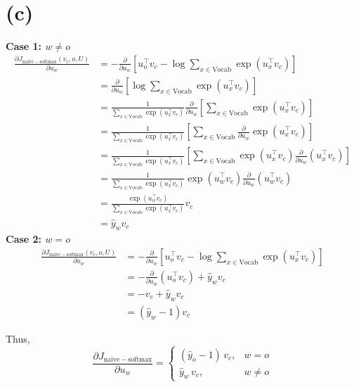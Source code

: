 \documentclass[12pt]{article}
\begin{document}
\section*{(c)}

\textbf{Case 1: $w \neq o$}
\begin{align*}
    \frac{\partial J_{\mathrm{naive-softmax}}(v_c, o, U)}{\partial u_{w}}
    &= - \frac{\partial }{\partial u_{w}} \left[ u_{o}^{\top}v_{c} - \log \sum_{x \in \mathrm{Vocab}} \exp(u_{x}^{\top}v_{c}) \right] \\
    &= \frac{\partial }{ \partial u_{w}} \left[\log \sum_{x \in \mathrm{Vocab}} \exp(u_{x}^{\top} v_{c})\right] \\
    &= \frac{1}{\sum_{x \in \mathrm{Vocab}} \exp(u_{x}^{\top} v_{c})} \frac{\partial }{ \partial u_{w}} \left[ \sum_{x \in \mathrm{Vocab}} \exp(u_{x}^{\top} v_{c})\right] \\
    &= \frac{1}{\sum_{x \in \mathrm{Vocab}} \exp(u_{x}^{\top} v_{c})}  \left[ \sum_{x \in \mathrm{Vocab}} \frac{\partial }{ \partial u_{w}} \exp(u_{x}^{\top} v_{c})\right] \\
    &= \frac{1}{\sum_{x \in \mathrm{Vocab}} \exp(u_{x}^{\top} v_{c})}  \left[ \sum_{x \in \mathrm{Vocab}} \exp(u_{x}^{\top} v_{c}) \frac{\partial }{ \partial u_{w}} (u_{x}^{\top} v_{c})\right]\\
    &= \frac{1}{\sum_{x \in \mathrm{Vocab}} \exp(u_{x}^{\top} v_{c})}  \exp(u_{w}^{\top} v_{c}) \frac{\partial }{ \partial u_{w}} (u_{w}^{\top} v_{c}) \\
    &= \frac{\exp(u_{w}^{\top} v_{c}) }{\sum_{x \in \mathrm{Vocab}} \exp(u_{x}^{\top} v_{c})} v_{c} \\
    &= \hat{y}_{w} v_{c}
\end{align*}
\textbf{Case 2: $w = o$}
\begin{align*}
    \frac{\partial J_{\mathrm{naive-softmax}}(v_c, o, U)}{\partial u_{w}}
    &= - \frac{\partial }{\partial u_{w}} \left[ u_{o}^{\top}v_{c} - \log \sum_{x \in \mathrm{Vocab}} \exp(u_{x}^{\top}v_{c}) \right] \\
    &= - \frac{\partial }{\partial u_{w}} ( u_{o}^{\top}v_{c}) +  \hat{y}_{w} v_{c} \\
    &= -v_{c} +  \hat{y}_{w} v_{c} \\
    &= ( \hat{y}_{w} - 1)v_{c}
\end{align*}

\medskip
\noindent Thus,
\[
    \frac{\partial J_{\mathrm{naive-softmax}}}{\partial u_w} =
    \begin{cases}
        (\hat{y}_o - 1) \, v_c, & w = o \\
        \hat{y}_w \, v_c,       & w \neq o
    \end{cases}
\]
\end{document}
